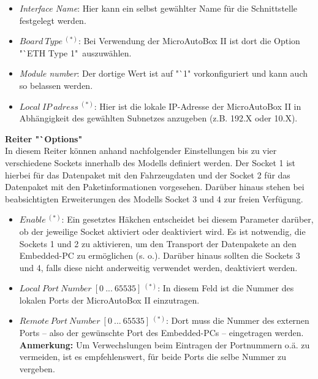 \documentclass[fontsize = 12pt, paper = a4]{scrreprt}
\begin{document}
\begin{itemize}

\item \textit{Interface Name}: Hier kann ein selbst gewählter Name für die Schnittstelle festgelegt werden.

\item \textit{$Board \ Type \ ^{(*)}$}: Bei Verwendung der MicroAutoBox II ist dort die Option \\ "`ETH Type 1"\ auszuwählen.

\item \textit{Module number}: Der dortige Wert ist auf "`1" vorkonfiguriert und kann auch so belassen werden.

\item \textit{$Local \ IP \ adress \ ^{(*)}$}: Hier ist die lokale IP-Adresse der MicroAutoBox II in Abhängigkeit des gewählten Subnetzes  anzugeben (z.B. 192.X oder 10.X).

\end{itemize}

\textbf{Reiter "`Options"} \\

In diesem Reiter können anhand nachfolgender Einstellungen bis zu vier verschiedene Sockets innerhalb des Modells definiert werden. Der Socket 1 ist hierbei für das Datenpaket mit den Fahrzeugdaten und der Socket 2 für das Datenpaket mit den Paketinformationen vorgesehen. Darüber hinaus stehen bei beabsichtigten Erweiterungen des Modells Socket 3 und 4 zur freien Verfügung.

\begin{itemize}

\item \textit{$Enable \ ^{(*)}$}: Ein gesetztes Häkchen entscheidet bei diesem Parameter darüber, ob der jeweilige Socket aktiviert oder deaktiviert wird. Es ist notwendig, die Sockets 1 und 2 zu aktivieren, um den Transport der Datenpakete an den Embedded-PC zu ermöglichen (s. o.). Darüber hinaus sollten die Sockets 3 und 4, falls diese nicht anderweitig verwendet werden, deaktiviert werden.  

\item \textit{$Local \ Port \ Number \ [0 \ ... \ 65535] \ ^{(*)}$}: In diesem Feld ist die Nummer des lokalen Ports der MicroAutoBox II einzutragen. 

\item \textit{$Remote \ Port \ Number \ [0 \ ... \ 65535] \ ^{(*)}$}:
Dort muss die Nummer des externen Ports -- also der gewünschte Port des Embedded-PCs -- eingetragen werden. \\ 

\textbf{Anmerkung:} Um Verwechslungen beim Eintragen der Portnummern o.ä. zu vermeiden, ist es empfehlenswert, für beide Ports die selbe Nummer zu vergeben. 

\end{itemize} 
\end{document}

